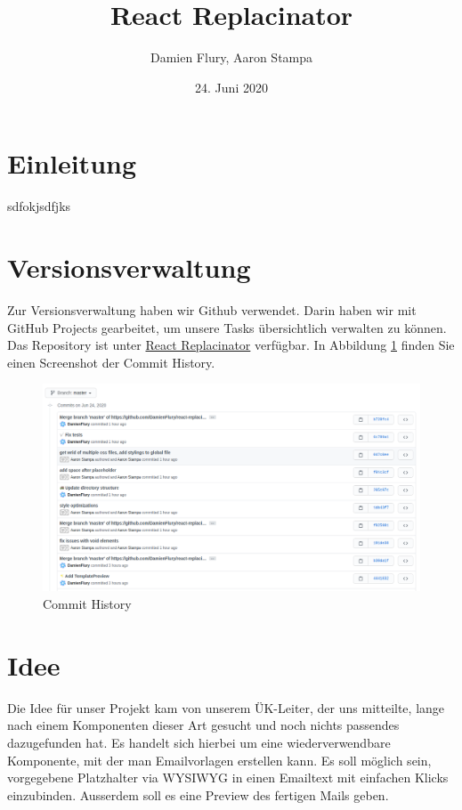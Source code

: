 \documentclass[a4paper, titlepage]{article}
\title{React Replacinator}
\author{Damien Flury, Aaron Stampa}
\date{24. Juni 2020}
\begin{document}
  \maketitle
  \tableofcontents
  \newpage
  \section{Einleitung}
  sdfokjsdfjks
  \section{Versionsverwaltung}
  Zur Versionsverwaltung haben wir Github verwendet.
  Darin haben wir mit GitHub Projects gearbeitet,
  um unsere Tasks übersichtlich verwalten zu
  können. Das Repository ist unter 
  \href{https://github.com/DamienFlury/react-replacinator}{React Replacinator}
  verfügbar. In Abbildung \ref{git:commit-history} finden Sie einen Screenshot
  der Commit History.

  \begin{figure}
    \includegraphics[width=\textwidth]{images/commit-history.png}
    \caption{Commit History}
    \label{git:commit-history}
  \end{figure}
  \section{Idee}
  Die Idee für unser Projekt kam von unserem ÜK-Leiter, der uns mitteilte, 
  lange nach einem Komponenten dieser Art gesucht und noch nichts passendes 
  dazugefunden hat. 
  Es handelt sich hierbei um eine wiederverwendbare Komponente, mit der man 
  Emailvorlagen erstellen kann. Es soll möglich sein, vorgegebene Platzhalter 
  via WYSIWYG in einen Emailtext mit einfachen Klicks einzubinden. 
  Ausserdem soll es eine Preview des fertigen Mails geben.
\end{document}
